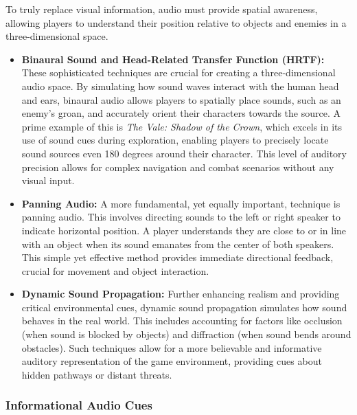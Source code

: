 To truly replace visual information, audio must provide spatial awareness, allowing players to understand their position relative to objects and enemies in a three-dimensional space.
\begin{itemize}
    \item \textbf{Binaural Sound and Head-Related Transfer Function (HRTF):} These sophisticated techniques are crucial for creating a three-dimensional audio space. By simulating how sound waves interact with the human head and ears, binaural audio allows players to spatially place sounds, such as an enemy's groan, and accurately orient their characters towards the source\supercite{LighthouseGuild2025}. A prime example of this is \textit{The Vale: Shadow of the Crown}, which excels in its use of sound cues during exploration, enabling players to precisely locate sound sources even 180 degrees around their character\supercite{AFBValeReview}. This level of auditory precision allows for complex navigation and combat scenarios without any visual input.
    \item \textbf{Panning Audio:} A more fundamental, yet equally important, technique is panning audio. This involves directing sounds to the left or right speaker to indicate horizontal position. A player understands they are close to or in line with an object when its sound emanates from the center of both speakers\supercite{AFBIntroVG}. This simple yet effective method provides immediate directional feedback, crucial for movement and object interaction.
    \item \textbf{Dynamic Sound Propagation:} Further enhancing realism and providing critical environmental cues, dynamic sound propagation simulates how sound behaves in the real world. This includes accounting for factors like occlusion (when sound is blocked by objects) and diffraction (when sound bends around obstacles)\supercite{NumberAnalytics2025}. Such techniques allow for a more believable and informative auditory representation of the game environment, providing cues about hidden pathways or distant threats.
\end{itemize}

\subsubsection{Informational Audio Cues}

